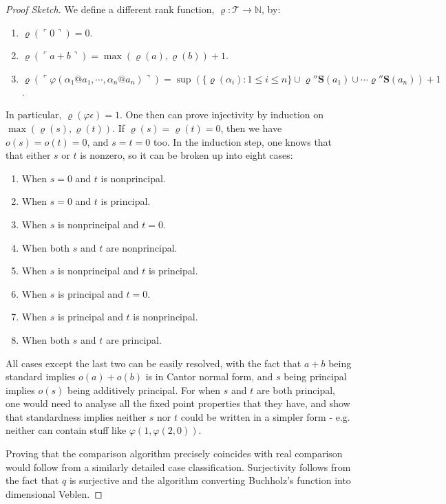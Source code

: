 \documentclass{article}
\theoremstyle{definition}
\theoremstyle{plain}
\theoremstyle{plain}
\theoremstyle{plain}
\theoremstyle{plain}
\theoremstyle{remark}
\theoremstyle{remark}
\theoremstyle{remark}
\theoremstyle{plain}
\theoremstyle{plain}
\begin{document}
\begin{proof}[Proof Sketch]
We define a different rank function, $\varrho: \mathcal{T} \to \mathbb{N}$, by:

\begin{enumerate}
    \item $\varrho(\ulcorner 0 \urcorner) = 0$.
    \item $\varrho(\ulcorner a+b \urcorner) = \max(\varrho(a), \varrho(b))+1$.
    \item $\varrho(\ulcorner \varphi (\alpha_1 @ a_1, \cdots, \alpha_n @ a_n) \urcorner) = \sup(\{\varrho(\alpha_i): 1 \leq i \leq n\} \cup \varrho''\mathbf{S}(a_1) \cup  \cdots \varrho''\mathbf{S}(a_n))+1$.
\end{enumerate}

In particular, $\varrho(\varphi \epsilon) = 1$. One then can prove injectivity by induction on $\max(\varrho(s), \varrho(t))$. If $\varrho(s) = \varrho(t) = 0$, then we have $o(s) = o(t) = 0$, and $s = t = 0$ too. In the induction step, one knows that that either $s$ or $t$ is nonzero, so it can be broken up into eight cases:

\begin{enumerate}
    \item When $s = 0$ and $t$ is nonprincipal.
    \item When $s = 0$ and $t$ is principal.
    \item When $s$ is nonprincipal and $t = 0$.
    \item When both $s$ and $t$ are nonprincipal.
    \item When $s$ is nonprincipal and $t$ is principal.
    \item When $s$ is principal and $t = 0$.
    \item When $s$ is principal and $t$ is nonprincipal.
    \item When both $s$ and $t$ are principal.
\end{enumerate}

All cases except the last two can be easily resolved, with the fact that $a+b$ being standard implies $o(a)+o(b)$ is in Cantor normal form, and $s$ being principal implies $o(s)$ being additively principal. For when $s$ and $t$ are both principal, one would need to analyse all the fixed point properties that they have, and show that standardness implies neither $s$ nor $t$ could be written in a simpler form - e.g. neither can contain stuff like $\varphi(1,\varphi(2,0))$.

Proving that the comparison algorithm precisely coincides with real comparison would follow from a similarly detailed case classification. Surjectivity follows from the fact that $q$ is surjective and the algorithm converting Buchholz's function into dimensional Veblen.
\end{proof}
\end{document}
